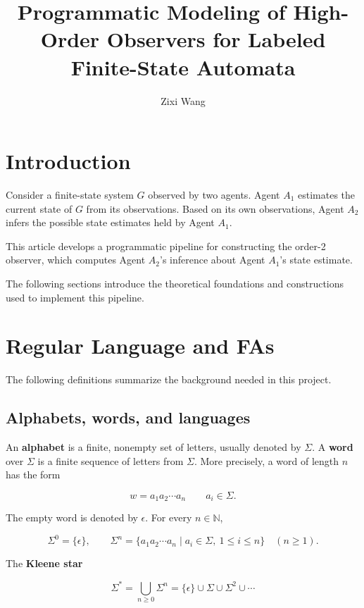\documentclass[11pt]{article}
\title{Programmatic Modeling of High-Order Observers for Labeled Finite-State Automata}
\author{Zixi Wang}
\date{}
\begin{document}
\maketitle

\tableofcontents
\newpage

\section{Introduction}


Consider a finite-state system $G$ observed by two agents. Agent $A_1$ estimates the
current state of $G$ from its observations. Based on its own observations, Agent
$A_2$ infers the possible state estimates held by Agent $A_1$.


This article develops a programmatic pipeline for constructing the order-2 observer,
which computes Agent $A_2$'s inference about Agent $A_1$'s state estimate.


The following sections introduce the theoretical foundations and constructions used to implement this pipeline.

\section{Regular Language and FAs}


The following definitions summarize the background needed in this project.

\subsection{Alphabets, words, and languages}


An \textbf{alphabet} is a finite, nonempty set of letters, usually denoted by $\Sigma$. A \textbf{word} over $\Sigma$ is a finite sequence of letters from $\Sigma$. More precisely, a word of length $n$ has the form

\[
w=a_1a_2\cdots a_n
\qquad a_i\in\Sigma.
\]

The empty word is denoted by $\epsilon$. For every $n\in\mathbb{N}$,

\[
\Sigma^0=\{\epsilon\},\qquad
\Sigma^n=\{a_1a_2\cdots a_n\mid a_i\in\Sigma,\ 1\leq i\leq n\}
\quad(n\geq 1).
\]

The \textbf{Kleene star}

\[
\Sigma^*=\bigcup_{n\geq 0}\Sigma^n
=\{\epsilon\}\cup\Sigma\cup\Sigma^2\cup\cdots
\]
\end{document}
